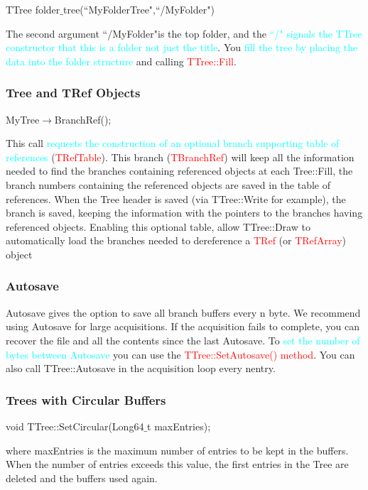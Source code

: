 \documentclass[12pt,a4paper]{article}
\begin{document}
TTree folder$\_$tree(``MyFolderTree",``/MyFolder")

The second argument ``/MyFolder"is the top folder, and the  \textcolor{cyan}{``/" signals the TTree constructor that this is a folder not just the title}. You  \textcolor{cyan}{fill the tree by placing the data into the folder structure} and calling  \textcolor{red}{TTree::Fill}.

\subsubsection{Tree and TRef Objects}
MyTree$\rightarrow$BranchRef();

This call \textcolor{cyan}{requests the construction of an optional branch supporting table of references} (\textcolor{red}{TRefTable}). This branch (\textcolor{red}{TBranchRef}) will keep all the information needed to find the branches containing referenced objects at each Tree::Fill, the branch numbers containing the referenced objects are saved in the table of references. When the Tree header is saved (via TTree::Write for example), the branch is saved, keeping the information with the pointers to the branches having referenced objects. Enabling this optional table, allow TTree::Draw to automatically load the branches needed to dereference a \textcolor{red}{TRef} (or \textcolor{red}{TRefArray}) object

\subsubsection{Autosave}
Autosave gives the option to save all branch buffers every n byte. We recommend using Autosave for large acquisitions. If the acquisition fails to complete, you can recover the file and all the contents since the last Autosave. To \textcolor{cyan}{set the number of bytes between Autosave} you can use the \textcolor{red}{TTree::SetAutosave() method}. You can also call TTree::Autosave in the acquisition loop every nentry.

\subsubsection{Trees with Circular Buffers}
void TTree::SetCircular(Long64$\_$t maxEntries);

where maxEntries is the maximum number of entries to be kept in the buffers. When the number of entries exceeds this value, the first entries in the Tree are deleted and the buffers used again.
\end{document}
